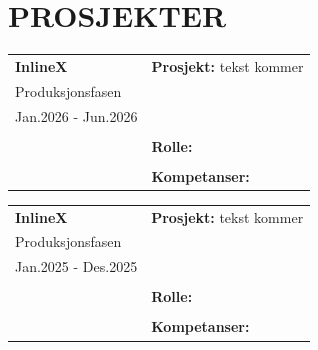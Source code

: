 \documentclass[a4paper,10pt]{article}
\begin{document}
\section{{\Huge \ubuntu PROSJEKTER}}


\noindent
\begin{longtable}{@{}p{4cm}p{11cm}@{}}  %
\textbf{InlineX}
& \textbf{Prosjekt:} tekst kommer \\
Produksjonsfasen & \\
Jan.2026 - Jun.2026 & \\
& \\
&  \textbf{Rolle:} \\
& \\
& \textbf{Kompetanser:} \\
\end{longtable}

\vspace{2em}



\noindent
\begin{longtable}{@{}p{4cm}p{11cm}@{}}  %
\textbf{InlineX}
& \textbf{Prosjekt:} tekst kommer \\
Produksjonsfasen & \\
Jan.2025 - Des.2025 & \\
& \\
&  \textbf{Rolle:} \\
& \\
& \textbf{Kompetanser:} \\
\end{longtable}

\vspace{2em}
\end{document}
